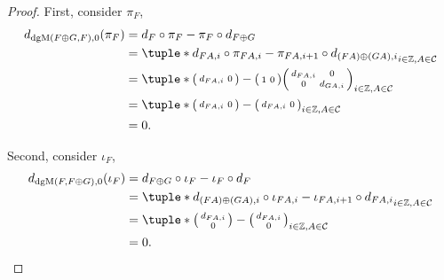\begin{proof}
    First, consider \( \pi_F \),
    \begin{align*}
        d_{\dgM(F \oplus G, F), 0} ( \pi_F ) &= d_F \circ \pi_F - \pi_F \circ d_{F \oplus G} \\
        &= \tuple*{ d_{F A, i} \circ \pi_{F A, i} - \pi_{F A, i + 1} \circ d_{(F A) \oplus (G A), i} }_{i \in \Zb, A \in \Cc} \\
        &= \tuple*{
            \begin{psmallmatrix}
                d_{F A, i} & 0
            \end{psmallmatrix}
            -
            \begin{psmallmatrix}
                1 & 0
            \end{psmallmatrix}
            \begin{psmallmatrix}
                d_{F A, i} & 0 \\
                0 & d_{G A, i}
            \end{psmallmatrix}
        }_{i \in \Zb, A \in \Cc} \\
        &= \tuple*{
            \begin{psmallmatrix}
                d_{F A, i} & 0
            \end{psmallmatrix}
            -
            \begin{psmallmatrix}
                d_{F A, i} & 0
            \end{psmallmatrix}
        }_{i \in \Zb, A \in \Cc} \\
        &= 0.
    \end{align*}

    Second, consider \( \iota_F \),
    \begin{align*}
        d_{\dgM(F, F \oplus G), 0} ( \iota_F ) &= d_{F \oplus G} \circ \iota_F - \iota_F \circ d_F \\
        &= \tuple*{ d_{(F A) \oplus (G A), i} \circ \iota_{F A, i} - \iota_{F A, i + 1} \circ d_{F A, i} }_{i \in \Zb, A \in \Cc} \\
        &= \tuple*{
            \begin{psmallmatrix}
                d_{F A, i} \\
                0
            \end{psmallmatrix}
            -
            \begin{psmallmatrix}
                d_{F A, i} \\
                0
            \end{psmallmatrix}
        }_{i \in \Zb, A \in \Cc} \\
        &= 0.
    \end{align*}
\end{proof}

